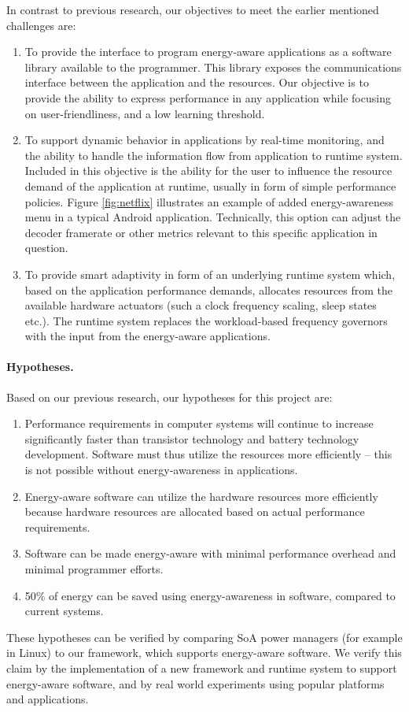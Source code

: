 \documentclass{article}
\begin{document}
In contrast to previous research, our objectives to meet the earlier mentioned challenges are:
\begin{enumerate}
 \item To provide the interface to program energy-aware applications as a software library available to the programmer. 
 This library exposes the communications interface between the application and the resources. 
 Our objective is to provide the ability to express performance in any application while focusing on user-friendliness, and a low learning threshold.
 \item To support dynamic behavior in applications by real-time monitoring, and the ability to handle the information flow from application to runtime system.
  Included in this objective is the ability for the user to influence the resource demand of the application at runtime, usually in form of simple performance policies.
  Figure \ref{fig:netflix} illustrates an example of added energy-awareness menu in a typical Android application.
  Technically, this option can adjust the decoder framerate or other metrics relevant to this specific application in question.
 \item To provide smart adaptivity in form of an underlying runtime system which, based on the application performance demands, allocates resources from the available hardware actuators (such a clock frequency scaling, sleep states etc.).
  The runtime system replaces the workload-based frequency governors with the input from the energy-aware applications.
\end{enumerate}


\paragraph{Hypotheses.}
Based on our previous research, our hypotheses for this project are:
\begin{enumerate}
 \item Performance requirements in computer systems will continue to increase significantly faster than transistor technology and battery technology development. 
 Software must thus utilize the resources more efficiently -- this is not possible without energy-awareness in applications.  \vspace{-0.2cm}
 \item Energy-aware software can utilize the hardware resources more efficiently because hardware resources are allocated based on actual performance requirements.\vspace{-0.2cm}
 \item Software can be made energy-aware with minimal performance overhead and minimal programmer efforts.\vspace{-0.2cm}
 \item 50\% of energy can be saved using energy-awareness in software, compared to current systems.
\end{enumerate}
These hypotheses can be verified by comparing SoA power managers (for example in Linux) to our framework, which supports energy-aware software.
We verify this claim by the implementation of a new framework and runtime system to support energy-aware software, and by real world experiments using popular platforms and applications.
\end{document}
